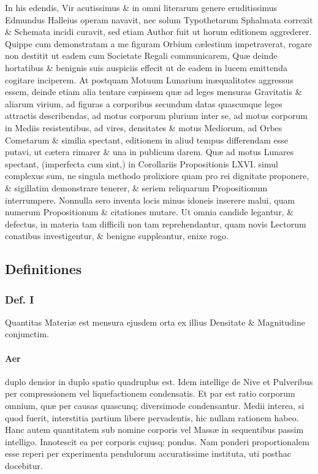 \documentclass{ansarticle}
\begin{document}
In his edendis, Vir acutissimus \& in omni literarum genere
eruditissimus Edmundus Halleius operam navavit, nec solum Typothetarum
Sphalmata correxit \& Schemata incidi curavit, sed etiam Author fuit ut
horum editionem aggrederer. Quippe cum demonstratam a me figuram
Orbium c\ae{}lestium impetraverat, rogare non destitit ut eadem cum
Societate Regali communicarem, Qu\ae{} deinde hortatibus \& benignis suis
auspiciis effecit ut de eadem in lucem emittenda cogitare
inciperem. At postquam Motuum Lunarium in\ae{}qualitates aggressus essem,
deinde etiam alia tentare c\ae{}pissem qu\ae{} ad leges mensuras Gravitatis \&
aliarum virium, ad figuras a corporibus secundum datas quascunque
leges attractis describendas, ad motus corporum plurium inter se, ad
motus corporum in Mediis resistentibus, ad vires, densitates \& motus
Mediorum, ad Orbes Cometarum \& similia spectant, editionem in aliud
tempus differendam esse putavi, ut c\ae{}tera rimarer \& una in publicum
darem. Qu\ae{} ad motus Lunares spectant, (imperfecta cum sint,) in
Corollariis Propositionis LXVI. simul complexus sum, ne singula
methodo prolixiore quam pro rei dignitate proponere, \& sigillatim
demonstrare tenerer, \& seriem reliquarum Propositionum
interrumpere. Nonnulla sero inventa locis minus idoneis inserere
malui, quam numerum Propositionum \& citationes mutare. Ut omnia
candide legantur, \& defectus, in materia tam difficili non tam
reprehendantur, quam novis Lectorum conatibus investigentur, \& benigne
suppleantur, enixe rogo.

\subsection{Definitiones}

\subsubsection{Def. I}

Quantitas Materi\ae{} est mensura ejusdem orta ex illius Densitate \&
Magnitudine conjunctim.

\paragraph{Aer}  duplo densior in duplo spatio quadruplus est. Idem
intellige de Nive et Pulveribus per compressionem vel liquefactionem
condensatis. Et par est ratio corporum omnium, qu\ae{} per causas
quascunq; diversimode condensantur. Medii interea, si quod fuerit,
interstitia partium libere pervadentis, hic nullam rationem
habeo. Hanc autem quantitatem sub nomine corporis vel Mass\ae{} in
sequentibus passim intelligo. Innotescit ea per corporis cujusq;
pondus. Nam ponderi proportionalem esse reperi per experimenta
pendulorum accuratissime instituta, uti posthac docebitur.
\end{document}
